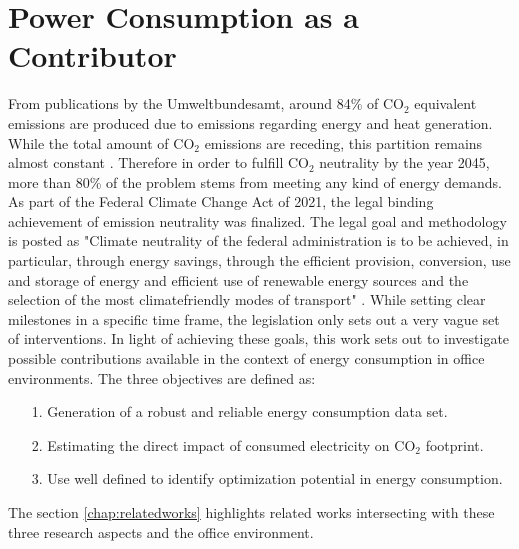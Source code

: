 \section{Power Consumption as a Contributor}\label{sec:powerConsumption}
From publications by the Umweltbundesamt, around 84\% of CO$_2$ equivalent emissions are produced due to emissions regarding energy and heat generation. While the total amount of CO$_2$ emissions are receding, this partition remains almost constant \cite{co2_contrib}. Therefore in order to fulfill CO$_2$ neutrality by the year 2045, more than 80\% of the problem stems from meeting any kind of energy demands. As part of the Federal Climate Change Act of 2021, the legal binding achievement of emission neutrality was finalized.
The legal goal and methodology is posted as "Climate neutrality of the federal administration is to be achieved, in particular, through
energy savings, through the efficient provision, conversion, use and storage of energy and
efficient use of renewable energy sources and the selection of the most climatefriendly modes of transport" \cite{fccl}. While setting clear milestones in a specific time frame, the legislation only sets out a very vague set of interventions. In light of achieving these goals, this work sets out to investigate possible contributions available in the context of energy consumption in office environments. The three objectives are defined as:
\begin{itemize}
	\item[1.] Generation of a robust and reliable energy consumption data set.
	\item[2.] Estimating the direct impact of consumed electricity on CO$_2$ footprint.
	\item[3.] Use well defined  to identify optimization potential in energy consumption.
\end{itemize}
The section \ref{chap:relatedworks} highlights related works intersecting with these three research aspects and the office environment.
